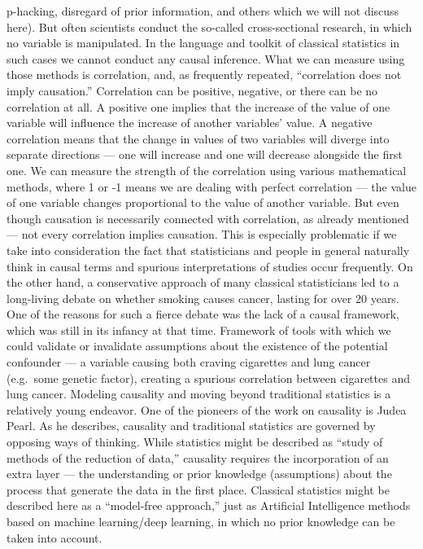 \documentclass[
  10pt,
  dvipsnames,enabledeprecatedfontcommands]{scrartcl}
\begin{document}
p-hacking, disregard of prior information, and others which we will not
discuss here). But often scientists conduct the so-called
cross-sectional research, in which no variable is manipulated. In the
language and toolkit of classical statistics in such cases we cannot
conduct any causal inference. What we can measure using those methods is
correlation, and, as frequently repeated, ``correlation does not imply
causation.'' Correlation can be positive, negative, or there can be no
correlation at all. A positive one implies that the increase of the
value of one variable will influence the increase of another variables'
value. A negative correlation means that the change in values of two
variables will diverge into separate directions --- one will increase
and one will decrease alongside the first one. We can measure the
strength of the correlation using various mathematical methods, where 1
or -1 means we are dealing with perfect correlation --- the value of one
variable changes proportional to the value of another variable. But even
though causation is necessarily connected with correlation, as already
mentioned --- not every correlation implies causation. This is
especially problematic if we take into consideration the fact that
statisticians and people in general naturally think in causal terms and
spurious interpretations of studies occur frequently. On the other hand,
a conservative approach of many classical statisticians led to a
long-living debate on whether smoking causes cancer, lasting for over 20
years. One of the reasons for such a fierce debate was the lack of a
causal framework, which was still in its infancy at that time. Framework
of tools with which we could validate or invalidate assumptions about
the existence of the potential confounder --- a variable causing both
craving cigarettes and lung cancer (e.g.~some genetic factor), creating
a spurious correlation between cigarettes and lung cancer. Modeling
causality and moving beyond traditional statistics is a relatively young
endeavor. One of the pioneers of the work on causality is Judea Pearl.
As he describes, causality and traditional statistics are governed by
opposing ways of thinking. While statistics might be described as
``study of methods of the reduction of data,'' causality requires the
incorporation of an extra layer --- the understanding or prior knowledge
(assumptions) about the process that generate the data in the first
place. Classical statistics might be described here as a ``model-free
approach,'' just as Artificial Intelligence methods based on machine
learning/deep learning, in which no prior knowledge can be taken into
account.
\end{document}
